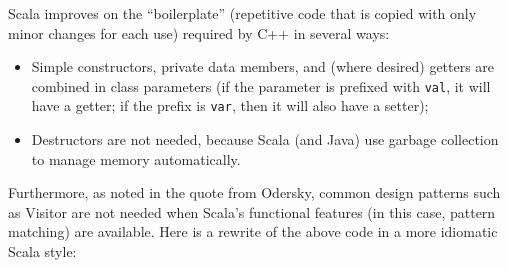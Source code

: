 \documentclass[11pt]{article}
\begin{document}
Scala improves on the ``boilerplate'' (repetitive code that is
copied with only minor changes for each use) required by C++ in
several ways:
\begin{itemize}
\item Simple constructors, private data members, and (where desired)
getters are combined in class parameters (if the parameter is
prefixed with \verb|val|, it will have a getter; if the prefix is
\verb|var|, then it will also have a setter);
\item Destructors are not needed, because Scala (and Java) use
garbage collection to manage memory automatically.
\end{itemize}
Furthermore, as noted in the quote from Odersky, common design
patterns such as Visitor are not needed when Scala's functional
features (in this case, pattern matching) are available. Here is a
rewrite of the above code in a more idiomatic Scala style:
\end{document}
